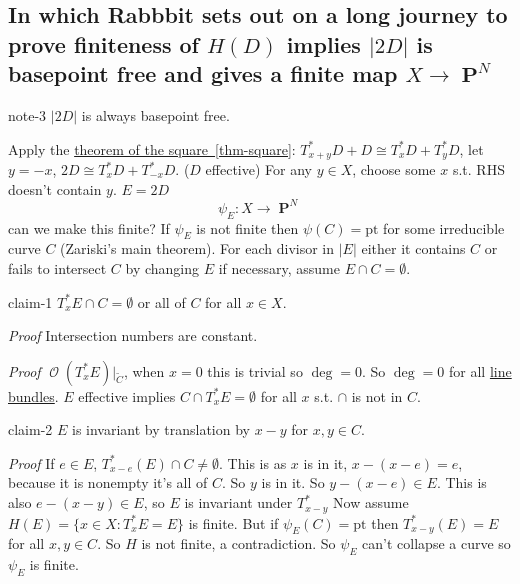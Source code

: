 \documentclass[10pt,]{book}
\makeatletter
\renewcommand*{\proofname}{Proof}
\renewenvironment{proof}[1][\proofname]{\par
  \pushQED{\qed}%
  \normalfont \topsep6\p@\@plus6\p@\relax
  \trivlist
  \item\relax
    {\itshape
    #1\@addpunct{.}}\hspace\labelsep\ignorespaces
}{%
  \popQED\endtrivlist\@endpefalse
}
\numberwithin{equation}{section}
\newcommand{\sheaf}[1]{\operatorname{\mathcal{#1}}}
\DeclareMathOperator{\PP}{\mathbf{P}}
\makeatother
\begin{document}
\subsection[{In which Rabbbit sets out on a long journey to prove finiteness of \(H(D)\) implies \(|2D|\) is basepoint free and gives a finite map \(X \to \PP^N\)}]{In which Rabbbit sets out on a long journey to prove finiteness of \(H(D)\) implies \(|2D|\) is basepoint free and gives a finite map \(X \to \PP^N\)}\label{sec-finite-HD-finite-PN}
\begin{note}{}{note-3}%
\hypertarget{p-147}{}%
\(|2D|\) is always basepoint free.%
\end{note}
\hypertarget{p-148}{}%
Apply the \hyperref[thm-square]{theorem of the square~\ref{thm-square}}: \(T_{x+y}^*D + D \cong T_x^* D + T_y^*D\), let \(y = -x\), \(2D \cong T_x^* D + T_{-x}^*D\). (\(D\) effective) For any \(y\in X\), choose some \(x\) s.t. RHS doesn't contain \(y\). \(E = 2D\)%
\begin{equation*}
\psi_E\colon X \to \PP^N
\end{equation*}
can we make this finite? If \(\psi_E\) is not finite then \(\psi(C) = \text{pt}\) for some irreducible curve \(C\) (Zariski's main theorem). For each divisor in \(|E|\) either it contains \(C\) or fails to intersect \(C\) by changing \(E\) if necessary, assume \(E \cap C = \emptyset\).%
\begin{claim}{}{}{claim-1}%
\hypertarget{p-149}{}%
\(T_x^*E\cap C= \emptyset\) or all of \(C\) for all \(x\in X\).%
\end{claim}
\begin{proof}\hypertarget{proof-26}{}
\hypertarget{p-150}{}%
Intersection numbers are constant.%
\end{proof}
\begin{proof}\hypertarget{proof-27}{}
\hypertarget{p-151}{}%
\(\sheaf O(T_x^*E)|_{\widetilde C}\), when \(x=0\) this is trivial so \(\deg =0\). So \(\deg = 0\) for all \hyperref[def-line-bundle]{line bundles}. \(E\) effective implies \(C\cap T_x^* E = \emptyset\) for all \(x\) s.t. \(\cap\) is not in \(C\).%
\end{proof}
\begin{claim}{}{}{claim-2}%
\hypertarget{p-152}{}%
\(E\) is invariant by translation by \(x - y\) for \(x,y \in C\).%
\end{claim}
\begin{proof}\hypertarget{proof-28}{}
\hypertarget{p-153}{}%
If \(e \in E\), \(T_{x-e}^*(E) \cap C \ne \emptyset\). This is as \(x\) is in it, \(x-(x-e) =e\), because it is nonempty it's all of \(C\). So \(y\) is in it. So \(y- (x-e) \in E\). This is also \(e - (x-y) \in E\), so \(E\) is invariant under \(T^*_{x-y}\)%
\end{proof}
\hypertarget{p-154}{}%
Now assume \(H(E) = \{x\in X: T_x^*E  = E \}\) is finite. But if \(\psi_E(C) = \text{pt}\) then \(T_{x-y}^*(E)  = E\) for all \(x,y\in C\). So \(H\) is not finite, a contradiction. So \(\psi_E\) can't collapse a curve so \(\psi_E\) is finite.%
%
%
\typeout{************************************************}
\typeout{************************************************}
%
\end{document}
